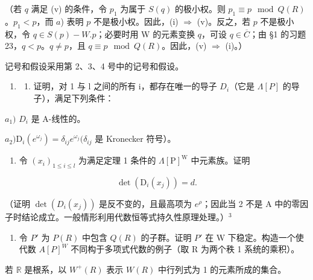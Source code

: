 （若 \(q\) 满足 (v) 的条件，令 \(p_1\) 为属于 \(S(q)\) 的极小权。则 \(p_1 \equiv p \mod Q(R)\)。\(p_1 < p\)，而 \(a\)) 表明 \(p\) 不是极小权。因此，(i) \(\Longrightarrow\) (v)。反之，若 \(p\) 不是极小权，令 \(q \in S(p) - W.p\)；必要时用 W 的元素变换 \(q\)，可设 \(q \in \overline{C}\)；由 §1 的习题 23，\(q < p\)。\(q \neq p\)，且 \(q \equiv p \mod Q(R)\)。因此，(v) \(\Longrightarrow\) (i)。）


记号和假设采用第 2、3、4 号中的记号和假设。

\begin{enumerate}
\def\labelenumi{\arabic{enumi})}
\tightlist
\item
  \begin{enumerate}
  \def\labelenumii{\alph{enumii})}
  \tightlist
  \item
    证明，对 1 与 l 之间的所有 i，都存在唯一的导子 \(D_{i}\)（它是 \(\Lambda[P]\) 的导子），满足下列条件：
  \end{enumerate}
\end{enumerate}

\(a_{1})\) \(D_{i}\) 是 A-线性的。

\(a_{2})\mathrm{D}_{i}(e^{\omega_{j}}) = \delta_{ij}e^{\omega_{j}}(\delta_{ij}\) 是 Kronecker 符号）。

\begin{enumerate}
\def\labelenumi{\alph{enumi})}
\setcounter{enumi}{1}
\tightlist
\item
  令 \((x_{i})_{1\leqslant i\leqslant l}\) 为满足定理 1 条件的 \(\Lambda [\mathrm{P}]^{\mathrm{W}}\) 中元素族。证明
\end{enumerate}

\[
\det \left(\mathrm{D} _ {i} (x _ {j})\right) = d.
\]

（证明 \(\det(D_{i}(x_{j}))\) 是反不变的，且最高项为 \(e^{\rho}\)；因此当 2 不是 A 中的零因子时结论成立。一般情形利用代数恒等式持久性原理处理。）\(^{3}\)

\begin{enumerate}
\def\labelenumi{\arabic{enumi})}
\setcounter{enumi}{1}
\tightlist
\item
  令 \(P'\) 为 \(P(R)\) 中包含 \(Q(R)\) 的子群。证明 \(P'\) 在 W 下稳定。构造一个使代数 \(A[P]^{W}\) 不同构于多项式代数的例子（取 R 为两个秩 1 系统的乘积）。
\end{enumerate}


若 \(\mathbb{R}\) 是根系，以 \(W^{+}(R)\) 表示 \(W(R)\) 中行列式为 1 的元素所成的集合。

